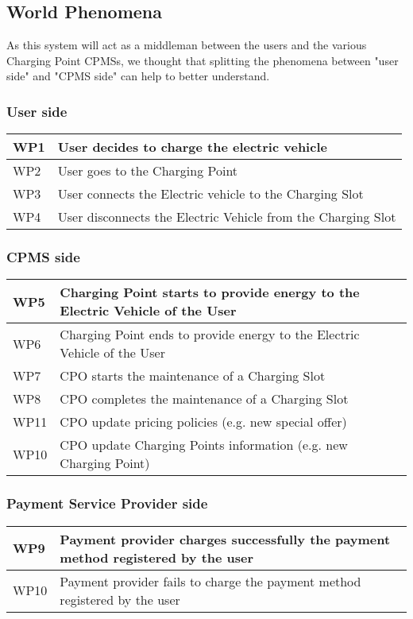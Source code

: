 \subsection{World Phenomena}
As this system will act as a middleman between the users and the various Charging Point CPMSs, we thought that splitting the phenomena between "user side" and "CPMS side" can help to better understand.

\subsubsection{User side}
\begin{tabular}{|l|l|}
	\hline
	WP1 & User decides to charge the electric vehicle\\
	\hline
	WP2 & User goes to the Charging Point\\
	\hline
	WP3 & User connects the Electric vehicle to the Charging Slot\\
	\hline
	WP4 & User disconnects the Electric Vehicle from the Charging Slot\\
	\hline
\end{tabular}

\subsubsection{CPMS side}
\begin{tabular}{|l|l|}
	\hline
	WP5 & Charging Point starts to provide energy to the Electric Vehicle of the User\\
	\hline
	WP6 & Charging Point ends to provide energy to the Electric Vehicle of the User\\
	\hline
	WP7 & CPO starts the maintenance of a Charging Slot\\
	\hline
	WP8 & CPO completes the maintenance of a Charging Slot\\
	\hline
	WP11 & CPO update pricing policies (e.g. new special offer)\\
	\hline
	WP10 & CPO update Charging Points information (e.g. new Charging Point)\\
	\hline
\end{tabular}

\subsubsection{Payment Service Provider side}
\begin{tabular}{|l|l|}
	\hline
	WP9 & Payment provider charges successfully the payment method registered by the user\\
	\hline
	WP10 & Payment provider fails to charge the payment method registered by the user\\
	\hline
\end{tabular}\\\\

